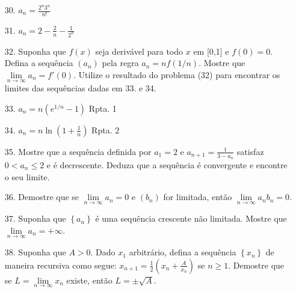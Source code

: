 \begin{itemize}
	\item [30.] $a_{n}=\frac{2^{n}3^{n}}{n!}$
\end{itemize}
\begin{itemize}
	\item [31.] $a_{n}=2-\frac{2}{n}-\frac{1}{2^{n}}$
\end{itemize}
\begin{itemize}
	\item [32.] Suponha que $f(x)$ seja derivável para todo $x$ em [0,1] e $f(0)=0$. Defina a sequência $\left( a_{n}\right) $ pela regra $a_{n}=nf(1/n)$. Mostre que $\lim\limits_{n\rightarrow \infty} a_{n}=f'(0)$. Utilize o resultado do problema (32) para encontrar os limites das sequências dadas em 33. e 34.
\end{itemize}
\begin{itemize}
	\item [33.] $a_{n}=n(e^{1/n}-1)$ \quad\quad  Rpta. 1 
\end{itemize}
\begin{itemize}
	\item [34.] $a_{n}=n\ln (1+\frac{1}{n})$ \quad\quad  Rpta. 2
\end{itemize}
\begin{itemize}
	\item [35.] Mostre que a sequência definida por $a_{1}=2$ e $a_{n+1}=\frac{1}{3-a_{n}}$ satisfaz $0<a_{n}\leq 2$ e é decrescente. Deduza que a sequência é convergente e encontre o seu limite.
\end{itemize}
\begin{itemize}
	\item [36.] Demostre que se $\lim\limits_{n\rightarrow \infty} a_{n}=0$ e $\left(  b_{n} \right)  $ for limitada, então $\lim\limits_{n\rightarrow \infty} a_{n}b_{n}=0$. 
\end{itemize}
\begin{itemize}
	\item [37.] Suponha que $\left\lbrace a_{n}\right\rbrace $ é uma sequência crescente não limitada. Mostre que  $\lim\limits_{n\rightarrow \infty} a_{n}=+\infty$.
\end{itemize}
\begin{itemize}
	\item [38.] Suponha que $A>0$. Dado $x_{1}$ arbitrário, defina a sequência $\left\lbrace x_{n} \right\rbrace$ de maneira recursiva como segue: $x_{n+1}=\frac{1}{2}(x_{n}+\frac{A}{x_{n}})$ se $n\geq 1$. Demostre que se $L=\lim\limits_{n\rightarrow \infty} x_{n}$ existe, então $L=\pm \sqrt{A}$.
\end{itemize}
